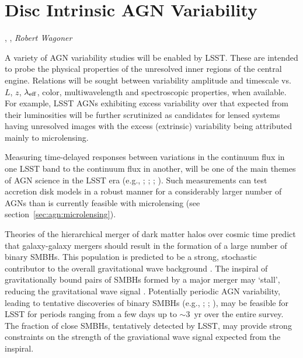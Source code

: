 %
%

\section{Disc Intrinsic AGN Variability}\label{sec:AGNContinuum}
\def\secname{\chpname:variability}\label{sec:\secname}

,
,
{\it Robert Wagoner}

A variety of AGN variability studies will be enabled by LSST. These are
intended to probe the physical properties of the unresolved inner regions
of the central engine. Relations will be sought between variability amplitude
and timescale vs. $L$, $z$, $\lambda_{\rm eff}$, color, multiwavelength and
spectroscopic properties, when available. For example, LSST AGNs exhibiting excess
variability over that expected from their luminosities will be further scrutinized
as candidates for lensed systems having unresolved images with the excess
(extrinsic) variability being attributed mainly to microlensing.

Measuring time-delayed responses between variations in the continuum flux in one
LSST band to the continuum flux in another, will be one of the main themes of
AGN science in the LSST era (e.g., \citealt{Chelouche2013};
\citealt{CheloucheandZucker2013}; \citealt{EdelsonEtal2015};
\citealt{FausnaughEtal2015}). Such measurements can test accretion disk models
in a robust manner for a considerably larger number of AGNs than is currently
feasible with microlensing (see section~\ref{sec:agn:microlensing}).

Theories of the hierarchical merger of dark matter halos over cosmic time
predict that galaxy-galaxy mergers should result in the formation of a large
number of binary SMBHs. This population is predicted to be a strong, stochastic
contributor to the overall gravitational wave background
\citep{2015arXiv151105564T}. The inspiral of gravitationally bound pairs of
SMBHs formed by a major merger may `stall', reducing the gravitational wave
signal \citep{2014SSRv..183..189C}. Potentially periodic AGN variability,
leading to tentative discoveries of binary SMBHs (e.g.,
\citealt{2015Natur.525..351D}; \citealt{GrahamEtal2015}; \citealt{LiuEtal2015}),
may be feasible for LSST for periods ranging from a few days up to $\sim3$~yr
over the entire survey. The fraction of close SMBHs, tentatively detected by
LSST, may provide strong constraints on the strength of the graviational wave
signal expected from the inspiral.

